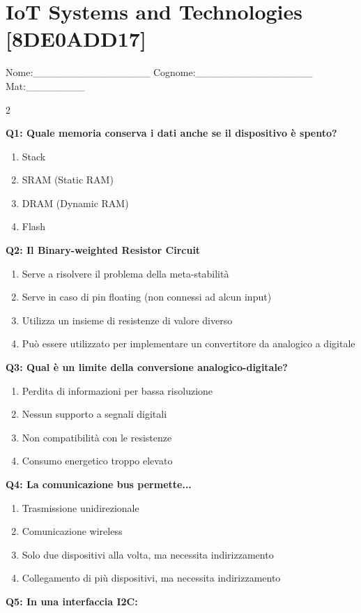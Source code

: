 \documentclass[10pt]{article}
\begin{document}
\newpage

\section*{IoT Systems and Technologies \footnotesize [8DE0ADD17]}
{\footnotesize Nome:\_\_\_\_\_\_\_\_\_\_\_\_\_\_\_\_ Cognome:\_\_\_\_\_\_\_\_\_\_\_\_\_\_\_\_ Mat:\_\_\_\_\_\_\_\_}
\begin{multicols}{2}

\textbf{Q1: Quale memoria conserva i dati anche se il dispositivo è spento?}

\begin{enumerate}[label=\arabic*.]
\item Stack
\item SRAM (Static RAM)
\item DRAM (Dynamic RAM)
\item Flash
\end{enumerate}
\textbf{Q2: Il Binary-weighted Resistor Circuit}

\begin{enumerate}[label=\arabic*.]
\item Serve a risolvere il problema della meta-stabilità
\item Serve in caso di pin floating (non connessi ad alcun input)
\item Utilizza un insieme di resistenze di valore diverso
\item Può essere utilizzato per implementare un convertitore da analogico a digitale
\end{enumerate}
\textbf{Q3: Qual è un limite della conversione analogico-digitale?}

\begin{enumerate}[label=\arabic*.]
\item Perdita di informazioni per bassa risoluzione
\item Nessun supporto a segnali digitali
\item Non compatibilità con le resistenze
\item Consumo energetico troppo elevato
\end{enumerate}
\textbf{Q4: La comunicazione bus permette...}

\begin{enumerate}[label=\arabic*.]
\item Trasmissione unidirezionale
\item Comunicazione wireless
\item Solo due dispositivi alla volta, ma necessita indirizzamento
\item Collegamento di più dispositivi, ma necessita indirizzamento
\end{enumerate}
\textbf{Q5: In una interfaccia I2C:}


\end{multicols}
\end{document}
